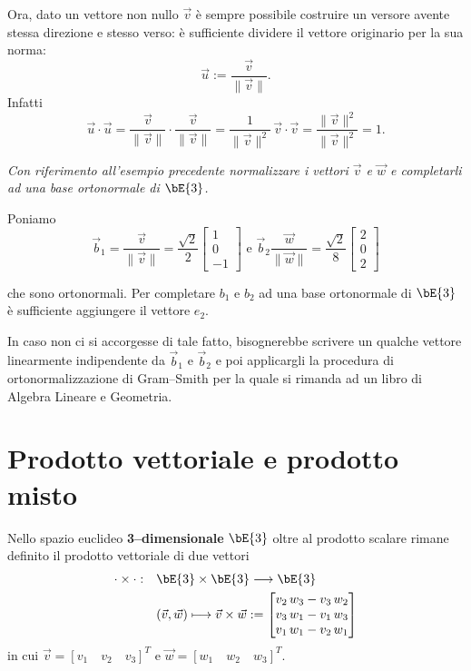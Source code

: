 Ora, dato un vettore non nullo $\vec v$ \`e sempre possibile costruire un 
versore avente 
stessa direzione e stesso verso: \`e sufficiente dividere il vettore originario
per la sua norma:
\[
  \vec u := \frac{\vec v}{\|\vec v\|}.
\]
Infatti
\[
  \vec u\cdot \vec u = \frac{\vec v}{\|\vec v\|}\cdot \frac{\vec v}{\|\vec v\|} 
  = \frac{1}{\|\vec v\|^2}\, \vec v\cdot \vec v = \frac{\|\vec v\|^2}{\|\vec 
v\|^2} = 1.
\]
\begin{example}
  {\it Con riferimento all'esempio precedente normalizzare i vettori $\vec v$ e 
$\vec w$
  e completarli ad una base ortonormale di $\bE{3}$.}
\end{example}
\begin{sol}
  Poniamo
  \[
  \vec b_1 = \frac{\vec v}{\|\vec v\|} = \frac{\sqrt 2}{2} \begin{bmatrix} 
1\\0\\-1 \end{bmatrix}
  \textrm{ e } 
  \vec b_2 \frac{\vec w}{\|\vec w\|} = \frac{\sqrt 2}{8} \begin{bmatrix} 2\\0\\2 
\end{bmatrix}\]
  
  che sono ortonormali. Per completare $b_1$ e $b_2$ ad una base ortonormale di 
  $\bE{3}$ \`e sufficiente aggiungere il vettore $e_2$.
  
  In caso non ci si accorgesse di tale fatto, bisognerebbe scrivere un qualche 
vettore 
  linearmente indipendente da $\vec b_1$ e $\vec b_2$ e poi applicargli la 
procedura 
  di ortonormalizzazione di Gram--Smith  per la quale si rimanda ad un libro di 
  Algebra Lineare e Geometria.
\end{sol}

\section{Prodotto vettoriale e prodotto misto}
Nello spazio euclideo {\bf 3--dimensionale} $\bE{3}$ oltre al prodotto scalare
rimane definito il prodotto  vettoriale di due vettori
\[\begin{aligned}
  \cdot \times \cdot : & \quad \bE{3}\times\bE{3} \longrightarrow \bE{3} \\
     & \quad (\vec v,\vec w) \longmapsto \vec v\times\vec w:=
     \begin{bmatrix} 
        v_2\,w_3 - v_3\,w_2 \\
        v_3\,w_1 - v_1\,w_3 \\
        v_1\,w_1-v_2\,w_1
     \end{bmatrix}
\end{aligned}\]     
in cui $\vec v = [v_1\quad v_2\quad v_3]^T$ e $\vec w = [w_1\quad w_2 \quad 
w_3]^T$.


